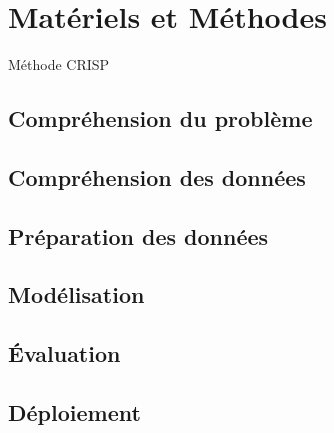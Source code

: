 \chapter{Matériels et Méthodes}

Méthode CRISP\cite{crisp}

\section{Compréhension du problème}
\section{Compréhension des données}
\section{Préparation des données}
\section{Modélisation}
\section{Évaluation}
\section{Déploiement}